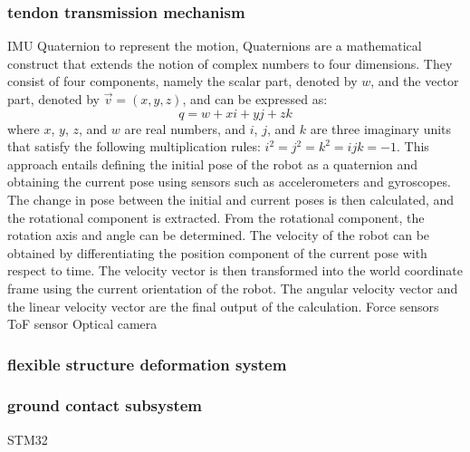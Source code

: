 \subsubsection{tendon transmission mechanism}
\ac{IMU} Quaternion to represent the motion, Quaternions are a mathematical construct that extends the notion of complex numbers to four dimensions. They consist of four components, namely the scalar part, denoted by $w$, and the vector part, denoted by $\vec{v}=(x, y, z)$, and can be expressed as:
$$q = w + xi + yj + zk$$
where $x$, $y$, $z$, and $w$ are real numbers, and $i$, $j$, and $k$ are three imaginary units that satisfy the following multiplication rules: $i^2 = j^2 = k^2 = ijk = -1$. This approach entails defining the initial pose of the robot as a quaternion and obtaining the current pose using sensors such as accelerometers and gyroscopes. The change in pose between the initial and current poses is then calculated, and the rotational component is extracted. From the rotational component, the rotation axis and angle can be determined. The velocity of the robot can be obtained by differentiating the position component of the current pose with respect to time. The velocity vector is then transformed into the world coordinate frame using the current orientation of the robot. The angular velocity vector and the linear velocity vector are the final output of the calculation.
Force sensors 
\ac{ToF} sensor 
Optical camera
\subsubsection{flexible structure deformation system}


\subsubsection{ground contact subsystem}
STM32 

